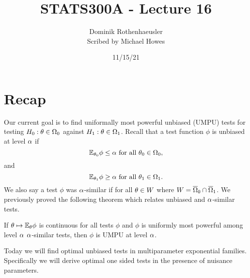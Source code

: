 


\newcommand{\poi}{\text{Pois}}


\title{STATS300A - Lecture 16}
\author{Dominik Rothenhaeusler\\ Scribed by Michael Howes}
\date{11/15/21}

\pagestyle{fancy}
\fancyhf{}


\maketitle
\tableofcontents
\section{Recap}
Our current goal is to find uniformally most powerful unbiased (UMPU) tests for testing $H_0 : {\theta} \in {{\Omega}}_0$ against $H_1 : {\theta} \in {{\Omega}}_1$. Recall that a test function $\phi$ is unbiased at level ${\alpha}$ if 
\[{\mathbb{E}}_{{\theta}_0}\phi \le {\alpha} \text{ for all } {\theta}_0 \in {{\Omega}}_0,\]
and 
\[{\mathbb{E}}_{{\theta}_1}\phi \ge {\alpha} \text{ for all } {\theta}_1 \in {{\Omega}}_1. \]
We also say a test $\phi$ was ${\alpha}$-similar if for all ${\theta} \in W$ where $W = \overline{{{\Omega}}}_0 \cap \overline{{{\Omega}}}_1$. We previously proved the following theorem which relates unbiased and ${\alpha}$-similar tests.
\begin{thrm}[TSH 4.11]\label{al_similar}
    If ${\theta} \mapsto {\mathbb{E}}_{\theta} \phi$ is continuous for all tests $\phi$ and $\phi$ is uniformly most powerful among level ${\alpha}$ ${\alpha}$-similar tests, then $\phi$ is UMPU at level ${\alpha}$. 
\end{thrm}
Today we will find optimal unbiased tests in multiparameter exponential families. Specifically we will derive optimal one sided tests in the presence of nuisance parameters.
